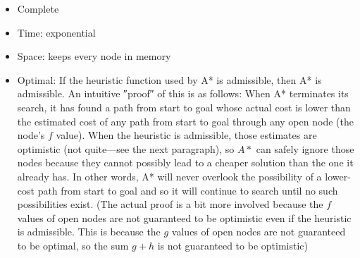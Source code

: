\begin{itemize}
  \item Complete
  \item Time: exponential
  \item Space: keeps every node in memory
  \item Optimal: If the heuristic function used by A* is
    admissible, then A* is admissible. 
    An intuitive ″proof″ of this is as follows: When
    A* terminates its search, it has found a path from start to
    goal whose actual cost is lower than the estimated cost of
    any path from start to goal through any open node (the node's
    $f$ value). 
    When the heuristic is admissible, those estimates are
    optimistic (not quite—see the next paragraph), so $A*$ can
    safely ignore those nodes because they cannot possibly lead
    to a cheaper solution than the one it already has. 
    In other words, A* will never overlook the
    possibility of a lower-cost path from start to goal and so it
    will continue to search until no such possibilities exist.
    (The actual proof is a bit more involved because the
    $f$ values of open nodes are not guaranteed to
    be optimistic even if the heuristic is admissible. This is
    because the $g$ values of open nodes are not guaranteed to be
    optimal, so the sum $g+h$ is not guaranteed to be optimistic)
\end{itemize}

